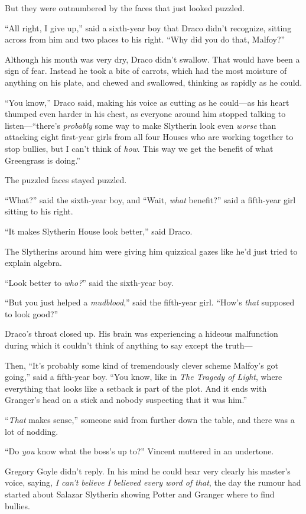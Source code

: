 But they were outnumbered by the faces that just looked puzzled.

“All right, I give up,” said a sixth-year boy that Draco didn’t recognize, sitting across from him and two places to his right. “Why did you do that, Malfoy?”

Although his mouth was very dry, Draco didn’t swallow. That would have been a sign of fear. Instead he took a bite of carrots, which had the most moisture of anything on his plate, and chewed and swallowed, thinking as rapidly as he could.

“You know,” Draco said, making his voice as cutting as he could—as his heart thumped even harder in his chest, as everyone around him stopped talking to listen—“there’s \emph{probably} some way to make Slytherin look even \emph{worse} than attacking eight first-year girls from all four Houses who are working together to stop bullies, but I can’t think of \emph{how}. This way we get the benefit of what Greengrass is doing.”

The puzzled faces stayed puzzled.

“What?” said the sixth-year boy, and “Wait, \emph{what} benefit?” said a fifth-year girl sitting to his right.

“It makes Slytherin House look better,” said Draco.

The Slytherins around him were giving him quizzical gazes like he’d just tried to explain algebra.

“Look better to \emph{who?}” said the sixth-year boy.

“But you just helped a \emph{mudblood},” said the fifth-year girl. “How’s \emph{that} supposed to look good?”

Draco’s throat closed up. His brain was experiencing a hideous malfunction during which it couldn’t think of anything to say except the truth—

Then, “It’s probably some kind of tremendously clever scheme Malfoy’s got going,” said a fifth-year boy. “You know, like in \emph{The Tragedy of Light}, where everything that looks like a setback is part of the plot. And it ends with Granger’s head on a stick and nobody suspecting that it was him.”

“\emph{That} makes sense,” someone said from further down the table, and there was a lot of nodding.

\later

“Do \emph{you} know what the boss’s up to?” Vincent muttered in an undertone.

Gregory Goyle didn’t reply. In his mind he could hear very clearly his master’s voice, saying, \emph{I can’t believe I believed every word of that}, the day the rumour had started about Salazar Slytherin showing Potter and Granger where to find bullies.

